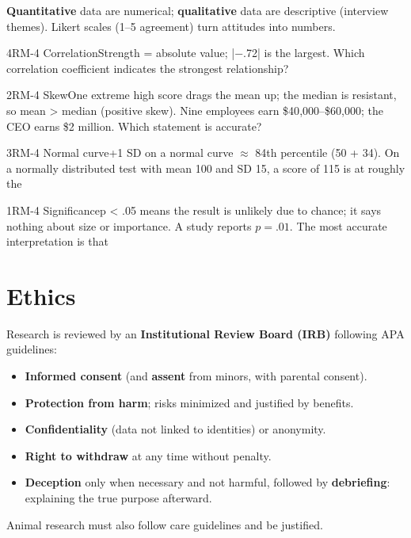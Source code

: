 \documentclass[11pt]{article}
\begin{document}
\textbf{Quantitative} data are numerical; \textbf{qualitative} data are descriptive (interview themes). Likert scales (1--5 agreement) turn attitudes into numbers.

\begin{q}{4}{RM-4 Correlation}{Strength = absolute value; |−.72| is the largest.}
Which correlation coefficient indicates the strongest relationship?
\end{q}

\begin{q}{2}{RM-4 Skew}{One extreme high score drags the mean up; the median is resistant, so mean > median (positive skew).}
Nine employees earn \$40{,}000--\$60{,}000; the CEO earns \$2 million. Which statement is accurate?
\end{q}

\begin{q}{3}{RM-4 Normal curve}{+1 SD on a normal curve \(\approx\) 84th percentile (50 + 34).}
On a normally distributed test with mean 100 and SD 15, a score of 115 is at roughly the
\end{q}

\begin{q}{1}{RM-4 Significance}{p < .05 means the result is unlikely due to chance; it says nothing about size or importance.}
A study reports \(p = .01\). The most accurate interpretation is that
\end{q}

\section{Ethics}

Research is reviewed by an \textbf{Institutional Review Board (IRB)} following APA guidelines:
\begin{itemize}
\item \textbf{Informed consent} (and \textbf{assent} from minors, with parental consent).
\item \textbf{Protection from harm}; risks minimized and justified by benefits.
\item \textbf{Confidentiality} (data not linked to identities) or anonymity.
\item \textbf{Right to withdraw} at any time without penalty.
\item \textbf{Deception} only when necessary and not harmful, followed by \textbf{debriefing}: explaining the true purpose afterward.
\end{itemize}
Animal research must also follow care guidelines and be justified.
\end{document}
